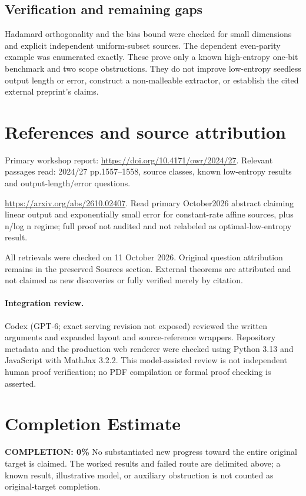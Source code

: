 \documentclass[11pt]{article}
\begin{document}
\subsection{Verification and remaining gaps}
Hadamard orthogonality and the bias bound were checked for small dimensions and explicit independent uniform-subset sources. The dependent even-parity example was enumerated exactly. These prove only a known high-entropy one-bit benchmark and two scope obstructions. They do not improve low-entropy seedless output length or error, construct a non-malleable extractor, or establish the cited external preprint's claims.

\section{References and source attribution}
Primary workshop report: \url{https://doi.org/10.4171/owr/2024/27}. Relevant passages read: 2024/27 pp.1557--1558, source classes, known low-entropy results and output-length/error questions.

\url{https://arxiv.org/abs/2610.02407}. Read primary October2026 abstract claiming linear output and exponentially small error for constant-rate affine sources, plus n/log n regime; full proof not audited and not relabeled as optimal-low-entropy result.

All retrievals were checked on 11 October 2026. Original question attribution remains in the preserved Sources section. External theorems are attributed and not claimed as new discoveries or fully verified merely by citation.


\paragraph{Integration review.} Codex (GPT-6; exact serving revision not exposed) reviewed the written arguments and expanded layout and source-reference wrappers. Repository metadata and the production web renderer were checked using Python 3.13 and JavaScript with MathJax 3.2.2. This model-assisted review is not independent human proof verification; no PDF compilation or formal proof checking is asserted.

\section{Completion Estimate}
\noindent\textbf{COMPLETION: 0\%}
No substantiated new progress toward the entire original target is claimed. The worked results and failed route are delimited above; a known result, illustrative model, or auxiliary obstruction is not counted as original-target completion.
\end{document}
